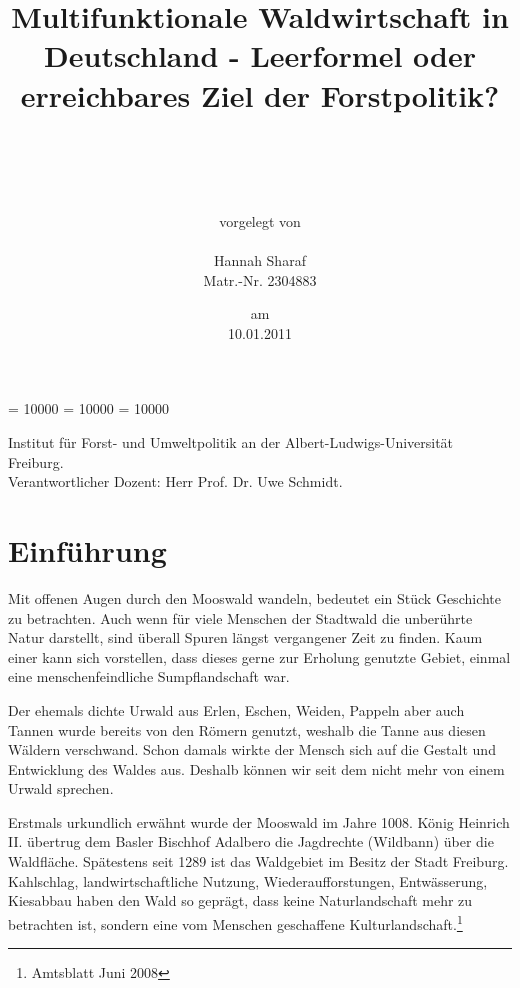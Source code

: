 \documentclass[12pt]{article}
\begin{document}
\clubpenalty = 10000
\widowpenalty = 10000 
\displaywidowpenalty = 10000

\onehalfspacing 


\begin{titlepage}

\title{Multifunktionale Waldwirtschaft in Deutschland - Leerformel oder erreichbares Ziel der Forstpolitik?}
\author{\\ \\ \\ \\ vorgelegt von \\ \\ Hannah Sharaf \\ Matr.-Nr. 2304883}
\date{am \\ 10.01.2011}
\maketitle
\vfill {\noindent Institut für Forst- und Umweltpolitik an der Albert-Ludwigs-Universität Freiburg. \\ Verantwortlicher Dozent: Herr Prof. Dr. Uwe Schmidt.}
\thispagestyle{empty}
\newpage

\end{titlepage} 


\section*{Einführung}
Mit offenen Augen durch den Mooswald wandeln, bedeutet ein Stück Geschichte zu betrachten.
Auch wenn für viele Menschen der Stadtwald die unberührte Natur darstellt, sind überall Spuren
längst vergangener Zeit zu finden. Kaum einer kann sich vorstellen, dass dieses gerne zur
Erholung genutzte Gebiet, einmal eine menschenfeindliche Sumpflandschaft war.

Der ehemals dichte Urwald aus Erlen, Eschen, Weiden, Pappeln aber auch Tannen wurde bereits von den
Römern genutzt, weshalb die Tanne aus diesen Wäldern verschwand. Schon damals wirkte der Mensch
sich auf die Gestalt und Entwicklung des Waldes aus. Deshalb können wir seit dem nicht mehr von
einem Urwald sprechen.

Erstmals urkundlich erwähnt wurde der Mooswald im Jahre 1008. König Heinrich II. übertrug dem Basler
Bischhof Adalbero die Jagdrechte (Wildbann) über die Waldfläche. Spätestens seit 1289 ist das Waldgebiet
im Besitz der Stadt Freiburg. Kahlschlag, landwirtschaftliche Nutzung, Wiederaufforstungen, Entwässerung, 
Kiesabbau haben den Wald so geprägt, dass keine Naturlandschaft mehr zu betrachten ist, sondern eine vom 
Menschen geschaffene Kulturlandschaft.\footnote{Amtsblatt Juni 2008}
\end{document}
